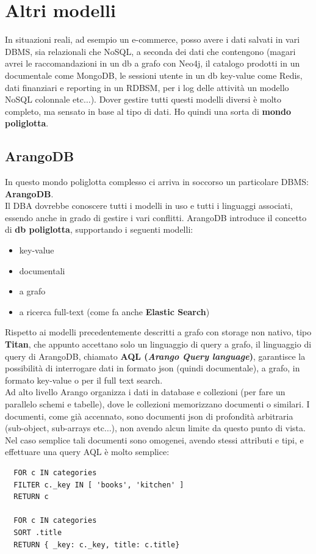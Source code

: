 \documentclass[a4paper,12pt, oneside]{book}
\begin{document}
\section{Altri modelli}
In situazioni reali, ad esempio un e-commerce, posso avere i dati salvati in
vari DBMS, sia relazionali che NoSQL, a seconda dei dati che contengono (magari
avrei le raccomandazioni in un db a grafo con Neo4j, il catalogo prodotti in un
documentale come MongoDB, le sessioni utente in un db key-value come Redis,
dati finanziari e reporting in un RDBSM, per i log delle attività un modello
NoSQL colonnale etc$\ldots$). Dover gestire tutti questi modelli diversi è molto
completo, ma sensato in base al tipo di dati. Ho quindi una sorta di
\textbf{mondo poliglotta}.
\subsection{ArangoDB}
In questo mondo poliglotta complesso ci arriva in soccorso un particolare DBMS:
\textbf{ArangoDB}.\\
Il DBA dovrebbe conoscere tutti i modelli in uso e tutti i linguaggi associati,
essendo anche in grado di gestire i vari conflitti. ArangoDB introduce il
concetto di \textbf{db poliglotta}, supportando i seguenti modelli:
\begin{itemize}
  \item key-value
  \item documentali
  \item a grafo
  \item a ricerca full-text (come fa anche \textbf{Elastic Search})
\end{itemize}
Rispetto ai modelli precedentemente descritti a grafo con storage non nativo,
tipo \textbf{Titan}, che appunto accettano solo un linguaggio di query a grafo,
il linguaggio di query di ArangoDB, chiamato \textbf{AQL (\textit{Arango Query
    language})}, garantisce la possibilità di interrogare dati in formato json
(quindi documentale), a grafo, in formato key-value o per il full text search.\\
Ad alto livello Arango organizza i dati in database e collezioni (per fare un
parallelo schemi e tabelle), dove le collezioni memorizzano documenti o
similari. I documenti, come già accennato, sono documenti json di profondità
arbitraria (sub-object, sub-arrays etc$\ldots$), non avendo alcun limite da
questo punto di vista. Nel caso semplice tali documenti sono omogenei, avendo
stessi attributi e tipi, e effettuare una query AQL è molto semplice:
\begin{verbatim}
  FOR c IN categories
  FILTER c._key IN [ 'books', 'kitchen' ]
  RETURN c

  FOR c IN categories
  SORT .title
  RETURN { _key: c._key, title: c.title}
\end{verbatim}
\end{document}
